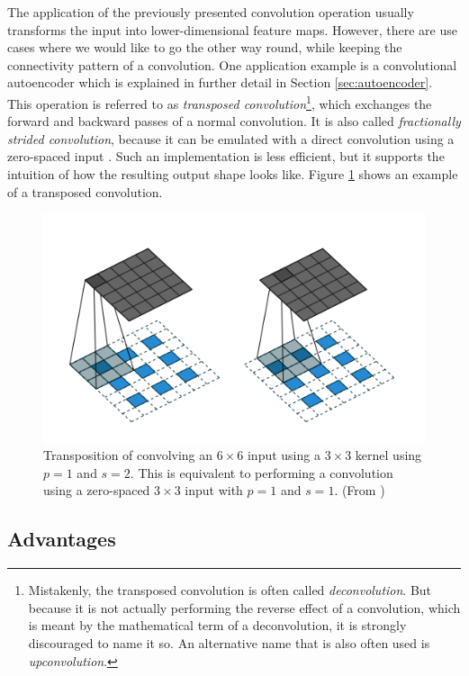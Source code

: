 The application of the previously presented convolution operation usually transforms the input into lower-dimensional feature maps. However, there are use cases where we would like to go the other way round, while keeping the connectivity pattern of a convolution. One application example is a convolutional autoencoder which is explained in further detail in Section \ref{sec:autoencoder}. This operation is referred to as \textit{transposed convolution}\footnote{Mistakenly, the transposed convolution is often called \textit{deconvolution}. But because it is not actually performing the reverse effect of a convolution, which is meant by the mathematical term of a deconvolution, it is strongly discouraged to name it so. An alternative name that is also often used is \textit{upconvolution}.}, which exchanges the forward and backward passes of a normal convolution. It is also called \textit{fractionally strided convolution}, because it can be emulated with a direct convolution using a zero-spaced input \parencite[p. 19]{conv_guide}. Such an implementation is less efficient, but it supports the intuition of how the resulting output shape looks like. Figure \ref{fig:conv_tp} shows an example of a transposed convolution.

\begin{figure}[htpb]
	\centering
	\includegraphics[scale=0.4]{figures/conv_tp.png}
	\caption[Transposed Convolution Operation]{Transposition of convolving an $6 \times 6$ input using a $3 \times 3$ kernel using $p=1$ and $s=2$. This is equivalent to performing a convolution using a zero-spaced $3 \times 3$ input with $p=1$ and $s=1$. (From \parencite{conv_guide})} \label{fig:conv_tp}
\end{figure}


\subsection{Advantages}

